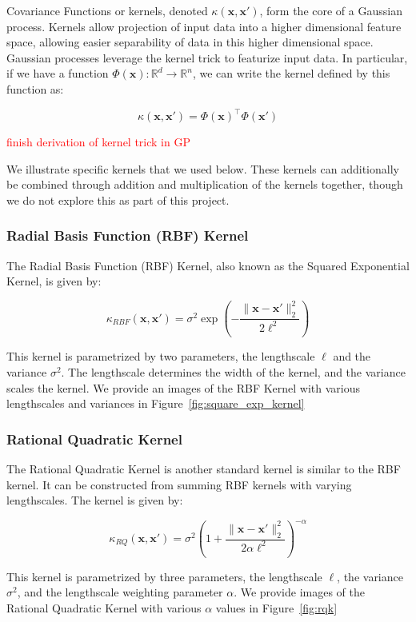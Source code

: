 \documentclass{article}
\newcommand{\R}{\mathbb{R}}
\newcommand{\bx}{\boldsymbol{x}}
\newcommand{\todo}[1]{\textcolor{red}{#1}}
\begin{document}
Covariance Functions or kernels, denoted $\kappa(\bx, \bx')$, form the core of a Gaussian process. Kernels allow
projection of input data into a higher dimensional feature space, allowing easier separability of data in this higher
dimensional space. Gaussian processes leverage the kernel trick to featurize input data. In particular, if we have a
function $\Phi(\bx): \R^d \rightarrow \R^n$, we can write the kernel defined by this function as:

\[
  \kappa(\bx, \bx') = \Phi(\bx)^\top \Phi(\bx')
\]

\todo{finish derivation of kernel trick in GP}

We illustrate specific kernels that we used below. These kernels can additionally be combined through addition and
multiplication of the kernels together, though we do not explore this as part of this project.

\subsubsection{Radial Basis Function (RBF) Kernel}

The Radial Basis Function (RBF) Kernel, also known as the Squared Exponential Kernel, is given by:

\[
  \kappa_{RBF}(\bx, \bx') = \sigma^2 \exp\left( - \frac{\|\bx -\bx' \|_{2}^{2}}{2 \ell^2} \right)
\]

This kernel is parametrized by two parameters, the lengthscale $\ell$ and the variance $\sigma^2$. The lengthscale
determines the width of the kernel, and the variance scales the kernel\cite{duvenaud_automatic_2014}. We provide an
images of the RBF Kernel with various lengthscales and variances in Figure~\ref{fig:square_exp_kernel}

\subsubsection{Rational Quadratic Kernel}

The Rational Quadratic Kernel is another standard kernel is similar to the RBF kernel. It can be constructed from
summing RBF kernels with varying lengthscales. The kernel is given by:

\[
  \kappa_{RQ}(\bx, \bx') = \sigma^2 \left( 1 + \frac{\| \bx - \bx' \|_{2}^{2}}{2 \alpha \ell^2} \right)^{-\alpha}
\]

This kernel is parametrized by three parameters, the lengthscale $\ell$, the variance $\sigma^2$, and the lengthscale
weighting parameter $\alpha$\cite{duvenaud_automatic_2014}. We provide images of the Rational Quadratic Kernel with
various $\alpha$ values in Figure~\ref{fig:rqk}
\end{document}
